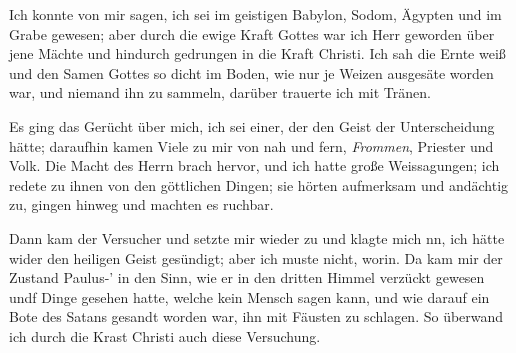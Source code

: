 Ich konnte von mir sagen, ich sei im geistigen Babylon, Sodom,
Ägypten und im Grabe gewesen; aber durch die ewige Kraft Gottes
war ich Herr geworden über jene Mächte und hindurch gedrungen
in die Kraft Christi. Ich sah die Ernte weiß und den Samen
Gottes so dicht im Boden, wie nur je Weizen ausgesäte worden
war, und niemand ihn zu sammeln, darüber trauerte ich mit
Tränen.

Es ging das Gerücht über mich, ich sei einer, der den Geist
der Unterscheidung hätte; daraufhin kamen Viele zu mir von nah
und fern, \textit{Frommen}, Priester und Volk. Die Macht des Herrn
brach hervor, und ich hatte große Weissagungen; ich redete zu
ihnen von den göttlichen Dingen; sie hörten aufmerksam und 
andächtig zu, gingen hinweg und machten es ruchbar.


Dann kam der Versucher und setzte mir wieder zu und
klagte mich nn, ich hätte wider den heiligen Geist gesündigt; aber
ich muste nicht, worin. Da kam mir der Zustand Paulus-’ in
den Sinn, wie er in den dritten Himmel verzückt gewesen undf
Dinge gesehen hatte, welche kein Mensch sagen kann, und wie
darauf ein Bote des Satans gesandt worden war, ihn mit
Fäusten zu schlagen. So überwand ich durch die Krast Christi
auch diese Versuchung.

